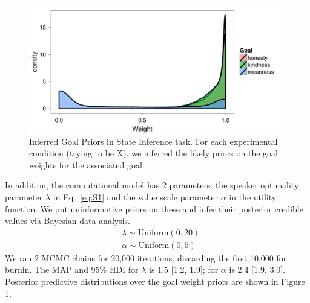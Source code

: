 \documentclass[10pt,letterpaper]{article}
\newcommand{\red}[1]{\textcolor{Red}{#1}}
\begin{document}
\begin{figure}
\begin{centering} 
\includegraphics[width=\columnwidth]{figures/goal-priors-bda.pdf}
\caption{\label{fig:goal-priors-bda} Inferred Goal Priors in State Inference task.
For each experimental condition (trying to be X), we inferred the likely priors on the goal weights for the associated goal.
}
\end{centering} 
\end{figure}
In addition, the computational model has 2 parameters: the speaker optimality parameter $\lambda$ in Eq.~\ref{eq:S1} and the value scale parameter $\alpha$ in the utility function. 
We put uninformative priors on these and infer their posterior credible values via Bayesian data analysis.
\begin{eqnarray*}
& \lambda \sim \text{Uniform}(0,20)\\
& \alpha \sim \text{Uniform}(0, 5)
\end{eqnarray*}
We ran 2 MCMC chains for 20,000 iterations, discarding the first 10,000 for burnin.
The MAP and 95\% HDI for $\lambda$ is 1.5 [1.2, 1.9]; for $\alpha$ is 2.4 [1.9, 3.0]. %
Posterior predictive distributions over the goal weight priors are shown in  Figure \ref{fig:goal-priors-bda}.
\end{document}
